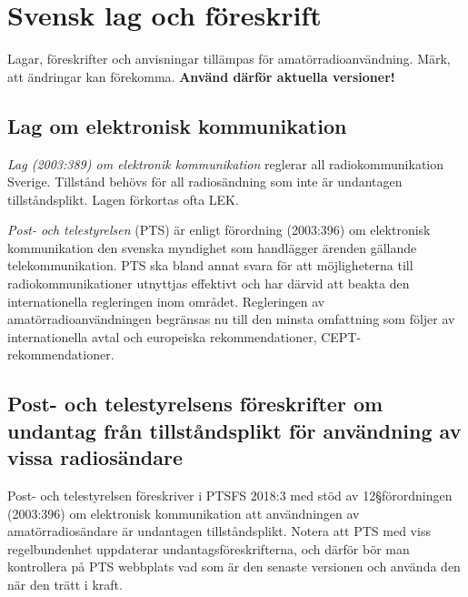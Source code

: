 \section{Svensk lag och föreskrift}
\label{svensk lag och föreskrift}

Lagar, föreskrifter och anvisningar tillämpas för
  amatörradioanvändning.
Märk, att ändringar kan förekomma.
\textbf{Använd därför aktuella versioner!}


\subsection{Lag om elektronisk kommunikation}

\emph{Lag (2003:389) om elektronik kommunikation}
 \cite{SFS2003:389}
reglerar all radiokommunikation Sverige.
Tillstånd behövs för all radiosändning som inte är undantagen tillståndsplikt. Lagen förkortas ofta LEK.

\emph{Post- och telestyrelsen} (PTS) är enligt förordning (2003:396) om
elektronisk kommunikation den svenska myndighet som handlägger ärenden gällande
telekommunikation.
PTS ska bland annat svara för att möjligheterna till radiokommunikationer
utnyttjas effektivt och har därvid att beakta den internationella regleringen
inom området.
Regleringen av amatörradioanvändningen begränsas nu till den minsta omfattning
som följer av internationella avtal och europeiska rekommendationer,
CEPT-rekommendationer.

\subsection{Post- och telestyrelsens föreskrifter om undantag från tillståndsplikt för användning av vissa radiosändare}
\label{PTSFS2018:3}

Post- och telestyrelsen föreskriver i PTSFS 2018:3 \cite{PTSFS2018:3} med stöd
av 12\S förordningen (2003:396) \cite{SFS2003:396} om elektronisk kommunikation
att användningen av amatörradiosändare är undantagen tillståndsplikt.
Notera att PTS med viss regelbundenhet uppdaterar undantagsföreskrifterna,
och därför bör man kontrollera på PTS webbplats vad som är den senaste versionen
och använda den när den trätt i kraft.

